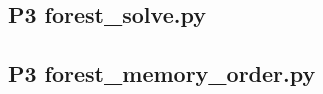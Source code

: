\documentclass[anonymous,withtoc]{gmcm2026}
\begin{document}
\subsection{P3 forest\_solve.py}

\subsection{P3 forest\_memory\_order.py}

\end{document}
